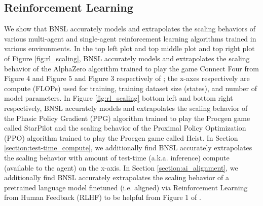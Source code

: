 \documentclass{article} %
\begin{document}

\FloatBarrier

\vspace{-1.8mm}

\subsection{Reinforcement Learning}
\label{section:reinforcement_learning}

\vspace{-1.8mm}

We show that BNSL accurately models and extrapolates the scaling behaviors of various multi-agent and single-agent reinforcement learning algorithms trained in various environments. In the top left plot and top middle plot and top right plot of Figure \ref{fig:rl_scaling}, BNSL accurately models and extrapolates the scaling behavior of the AlphaZero algorithm \citep{silver2017mastering} trained to play the game Connect Four from Figure 4 and Figure 5 and Figure 3 respectively of \cite{neumann2022scaling}; the x-axes respectively are compute (FLOPs) used for training, training dataset size (states), and number of model parameters. In Figure \ref{fig:rl_scaling} bottom left and bottom right respectively, BNSL accurately models and extrapolates the scaling behavior of the Phasic Policy Gradient (PPG) algorithm \citep{cobbe2021phasic} trained to play the Procgen \citep{cobbe2020leveraging} game called StarPilot and the scaling behavior of the Proximal Policy Optimization (PPO) algorithm \citep{schulman2017proximal} trained to play the Procgen \citep{cobbe2020leveraging} game called Heist. \vspace{0.1mm} \newline
In Section \ref{section:test-time_compute}, we additionally find BNSL accurately extrapolates the scaling behavior with amount of test-time (a.k.a. inference) compute (available to the agent) on the x-axis. \vspace{0.1mm} \newline
In Section \ref{section:ai_alignment}, we additionally find BNSL accurately extrapolates the scaling behavior of a pretrained language model finetuned (i.e. aligned) via Reinforcement Learning from Human Feedback (RLHF) to be helpful from Figure 1 of \cite{bai2022training}.
\end{document}
